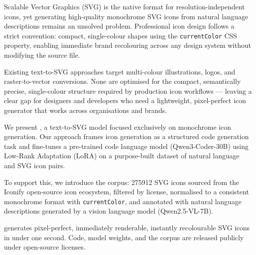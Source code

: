 
Scalable Vector Graphics (SVG) is the native format for resolution-independent
icons, yet generating high-quality monochrome SVG icons from natural language
descriptions remains an unsolved problem. Professional icon design follows a
strict convention: compact, single-colour shapes using the \texttt{currentColor}
CSS property, enabling immediate brand recolouring across any design system
without modifying the source file.

Existing text-to-SVG approaches target multi-colour illustrations, logos, and
raster-to-vector conversions. None are optimised for the compact, semantically
precise, single-colour structure required by production icon workflows --- leaving
a clear gap for designers and developers who need a lightweight, pixel-perfect
icon generator that works across organisations and brands.

We present \textbf{\method}, a text-to-SVG model focused exclusively on
monochrome icon generation. Our approach frames icon generation as a structured
code generation task and fine-tunes a pre-trained code language model
(Qwen3-Coder-30B) using Low-Rank Adaptation (LoRA) on a purpose-built dataset of
natural language and SVG icon pairs.

To support this, we introduce the \textbf{\dataset{}} corpus: \num{275912}
SVG icons sourced from the Iconify open-source icon ecosystem, filtered by
license, normalised to a consistent monochrome format with \texttt{currentColor},
and annotated with natural language descriptions generated by a vision language
model (Qwen2.5-VL-7B).


\method{} generates pixel-perfect, immediately renderable, instantly recolourable
SVG icons in under one second. Code, model weights, and the \dataset{} corpus
are released publicly under open-source licenses.
